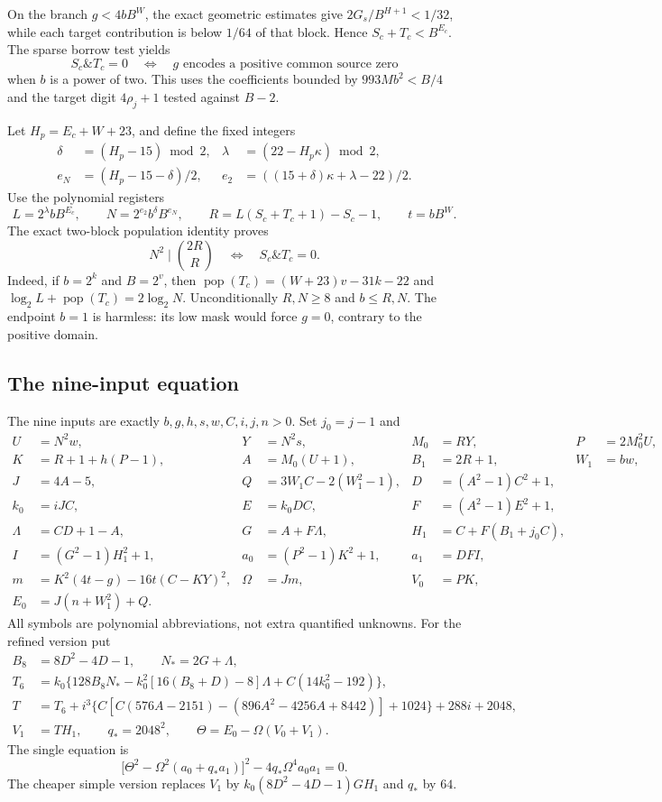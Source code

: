 On the branch $g<4bB^W$, the exact geometric estimates give
$2G_s/B^{H+1}<1/32$, while each target contribution is below $1/64$ of
that block.  Hence $S_c+T_c<B^{E_c}$.  The sparse borrow test yields
\[
 S_c\mathbin{\&}T_c=0
 \quad\Longleftrightarrow\quad
 g\text{ encodes a positive common source zero}
\]
when $b$ is a power of two.  This uses the coefficients bounded by
$993Mb^2<B/4$ and the target digit $4\rho_j+1$ tested against $B-2$.

Let $H_p=E_c+W+23$, and define the fixed integers
\begin{align*}
 \delta&=(H_p-15)\bmod2,&\lambda&=(22-H_p\kappa)\bmod2,\\
 e_N&=(H_p-15-\delta)/2,&e_2&=((15+\delta)\kappa+\lambda-22)/2.
\end{align*}
Use the polynomial registers
\[
 L=2^\lambda bB^{E_c},\qquad N=2^{e_2}b^\delta B^{e_N},\qquad
 R=L(S_c+T_c+1)-S_c-1,\qquad t=bB^W.
\]
The exact two-block population identity proves
\[
 N^2\mid {2R\choose R}\quad\Longleftrightarrow\quad S_c\mathbin{\&}T_c=0.
\]
Indeed, if $b=2^k$ and $B=2^v$, then
$\operatorname{pop}(T_c)=(W+23)v-31k-22$ and
$\log_2L+\operatorname{pop}(T_c)=2\log_2N$.
Unconditionally $R,N\ge8$ and $b\le R,N$.  The endpoint $b=1$ is harmless:
its low mask would force $g=0$, contrary to the positive domain.

\subsection{The nine-input equation}
The nine inputs are exactly $b,g,h,s,w,C,i,j,n>0$.  Set $j_0=j-1$ and
\begin{align*}
 U&=N^2w,&Y&=N^2s,&M_0&=RY,&P&=2M_0^2U,\\
 K&=R+1+h(P-1),&A&=M_0(U+1),&B_1&=2R+1,&W_1&=bw,\\
 J&=4A-5,&Q&=3W_1C-2(W_1^2-1),&D&=(A^2-1)C^2+1,\\
 k_0&=iJC,&E&=k_0DC,&F&=(A^2-1)E^2+1,\\
 \Lambda&=CD+1-A,&G&=A+F\Lambda,&H_1&=C+F(B_1+j_0C),\\
 I&=(G^2-1)H_1^2+1,&a_0&=(P^2-1)K^2+1,&a_1&=DFI,\\
 m&=K^2(4t-g)-16t(C-KY)^2,&\Omega&=Jm,&V_0&=PK,\\
 E_0&=J(n+W_1^2)+Q.&&&&
\end{align*}
All symbols are polynomial abbreviations, not extra quantified unknowns.
For the refined version put
\begin{align*}
 B_8&=8D^2-4D-1,\qquad N_* =2G+\Lambda,\\
 T_6&=k_0\{128B_8N_*-k_0^2[16(B_8+D)-8]\Lambda
                       +C(14k_0^2-192)\},\\
 T&=T_6+i^3\{C[C(576A-2151)-(896A^2-4256A+8442)]+1024\}
          +288i+2048,\\
 V_1&=TH_1,\qquad q_*=2048^2,\qquad
 \Theta=E_0-\Omega(V_0+V_1).
\end{align*}
The single equation is
\begin{equation}
 \boxed{\bigl[\Theta^2-\Omega^2(a_0+q_*a_1)\bigr]^2
             -4q_*\Omega^4a_0a_1=0.}
 \label{eq:round9-refined-nine}
\end{equation}
The cheaper simple version replaces $V_1$ by
$k_0(8D^2-4D-1)GH_1$ and $q_*$ by $64$.

